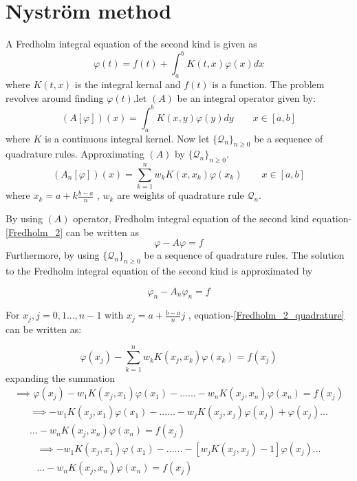 \documentclass[../document.tex]{subfiles}
\begin{document}
	
	\section{Nyström method}	
	
	A Fredholm integral equation of the second kind is given as
	\begin{equation} \label{Fredholm_2}
		\varphi(t) = f(t) + \int_{a}^{b} K(t,x)\varphi(x) dx 
	\end{equation} 
	where $K(t,x)$ is the integral kernal and $f(t)$ is a function. The problem revolves around finding $\varphi(t)$.let $(A)$ be an integral operator given by:
	\begin{equation*}
		(A[\varphi])(x) = \int_a^b K(x,y)\varphi(y)dy  \quad\quad x \in [a,b]
	\end{equation*} 
	where $K$ is a continuous integral kernel. Now let $\{\mathcal{Q}_n \}_{n\geq 0}$ be a sequence of quadrature rules.
	Approximating $(A)$ by  $\{\mathcal{Q}_n \}_{n\geq 0}$. 
	$$
	(A_n[\varphi])(x) = \sum_{k=1}^{n} w_k K(x,x_k)\varphi(x_k)  \quad\quad x \in [a,b]
	$$
	where $x_k = a + k\frac{b-a}{n}$ , $w_k$ are weights of quadrature rule $\mathcal{Q}_n$.
	
	By using $(A)$ operator, Fredholm integral equation of the second kind {equation-\eqref{Fredholm_2}} can be written as 
	$$
	\varphi - A\varphi = f
	$$
	Furthermore, by using  $\{\mathcal{Q}_n \}_{n\geq 0}$ be a  sequence of quadrature rules. The solution to the Fredholm integral equation of the second kind is approximated by 
	
	\begin{equation} \label{Fredholm_2_quadrature}
		\varphi_n - A_n\varphi_n = f
	\end{equation} 
	
	For $x_j , j= 0 ,1 ...,n-1$ with $x_j = a + \frac{b-a}{n}j$ , equation-\eqref{Fredholm_2_quadrature} can be written as:
	
	$$
	\varphi(x_j) -\sum_{k=1}^{n} w_k K(x_j,x_k) \varphi(x_k) = f(x_j)
	$$
	expanding the summation
	\begin{multline*}
		\implies \varphi(x_j) -w_1 K(x_j,x_1)\varphi(x_1) -...... - w_n K(x_j,x_n) \varphi(x_n) = f(x_j) 
	\end{multline*}
	\begin{multline*}
		\implies -w_1 K(x_j,x_1)\varphi(x_1) -......
		-w_j K(x_j,x_j) \varphi(x_j) + \varphi(x_j)  
		...\\...  -w_n K(x_j,x_n) \varphi(x_n) = f(x_j)  
	\end{multline*}
	\begin{multline*}
		\implies -w_1 K(x_j,x_1)\varphi(x_1) -...... 
		-\left[ w_j K(x_j,x_j) - 1\right] \varphi(x_j)  
		...\\...  -w_n K(x_j,x_n) \varphi(x_n) = f(x_j)
	\end{multline*}
	
\end{document}

